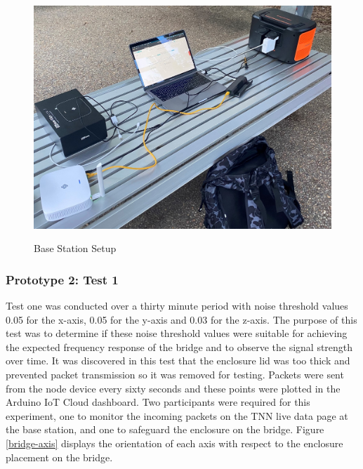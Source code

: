 \begin{figure}[H]
	\centering
	\caption{Base Station Setup}
	\includegraphics[width=\textwidth]{Sections/Prototype-Testing/base-station.png}
	\label{base-station}
\end{figure}

\subsubsection{Prototype 2: Test 1}
Test one was conducted over a thirty minute period with noise threshold values 0.05 for the x-axis, 0.05 for the y-axis and 0.03 for the z-axis. The purpose of this test was to determine if these noise threshold values were suitable for achieving the expected frequency response of the bridge and to observe the signal strength over time. It was discovered in this test that the enclosure lid was too thick and prevented packet transmission so it was removed for testing. Packets were sent from the node device every sixty seconds and these points were plotted in the Arduino IoT Cloud dashboard. Two participants were required for this experiment, one to monitor the incoming packets on the TNN live data page at the base station, and one to safeguard the enclosure on the bridge. Figure \ref{bridge-axis} displays the orientation of each axis with respect to the enclosure placement on the bridge. 

